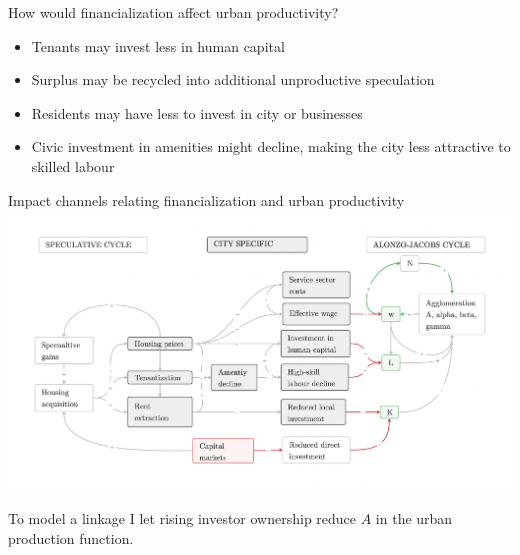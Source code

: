 \documentclass[]{beamer} %
\begin{document}
\begin{frame}{How would financialization affect urban productivity?}
\vspace{.75cm}
\begin{itemize}\Large
\item Tenants may invest less in human capital
\item Surplus may be recycled into additional unproductive speculation
\item Residents may have less to invest in city or businesses
\item Civic investment in amenities might decline, making the city less attractive to skilled labour
\end{itemize}
\end{frame}


\begin{frame}{Impact channels relating financialization and urban productivity}
\includegraphics[scale=.09]{fig/impact-channels.png}

To model a linkage I let rising investor ownership reduce $A$ in the urban production function.
\end{frame}


\end{document}
